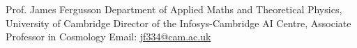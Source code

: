\vspace{0.10mm}
\par
\vspace{1.30mm}
\begin{cventries}
  \eduentry
    {Prof. James Fergusson}  %
    {Department of Applied Maths and Theoretical Physics, University of Cambridge}  %
    {Director of the Infosys-Cambridge AI Centre, Associate Professor in Cosmology \enskip\textbullet\enskip Email: \href{mailto:jf334@cam.ac.uk}{jf334@cam.ac.uk}}
    {}  %
    \vspace{-2mm}
\end{cventries}
